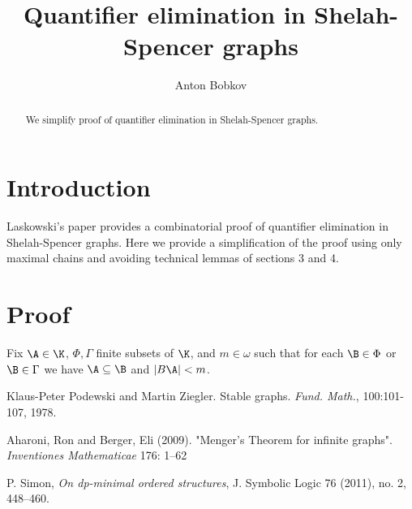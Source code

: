 \documentclass{amsart}
\begin{document}
\title{Quantifier elimination in Shelah-Spencer graphs}
\author{Anton Bobkov}

\begin{abstract}
	We simplify \cite{Laskowski} proof of quantifier elimination in Shelah-Spencer graphs.
\end{abstract}

\maketitle

\section{Introduction}

Laskowski's paper \cite{Laskowski} provides a combinatorial proof of quantifier elimination in Shelah-Spencer graphs. Here we provide a simplification of the proof using only maximal chains and avoiding technical lemmas of sections 3 and 4.

\section{Proof}

\begin{Definition}
	Fix $\A \in \K$, $\Phi, \Gamma$ finite subsets of $\K$, and $m \in \omega$ such that for each $\B \in \Phi$ or $\B \in \Gamma$ we have $\A \subseteq \B$ and $|B\A| < m$.
\end{Definition}

\begin{thebibliography}{9}

	Klaus-Peter Podewski and Martin Ziegler. Stable graphs. \textit{Fund. Math.}, 100:101-107, 1978.

	Aharoni, Ron and Berger, Eli (2009). "Menger's Theorem for infinite graphs". \textit{Inventiones Mathematicae} 176: 1–62
	
	P. Simon, \textit{On dp-minimal ordered structures}, J. Symbolic Logic 76 (2011), no. 2, 448–460.


\end{thebibliography}
\end{document}

